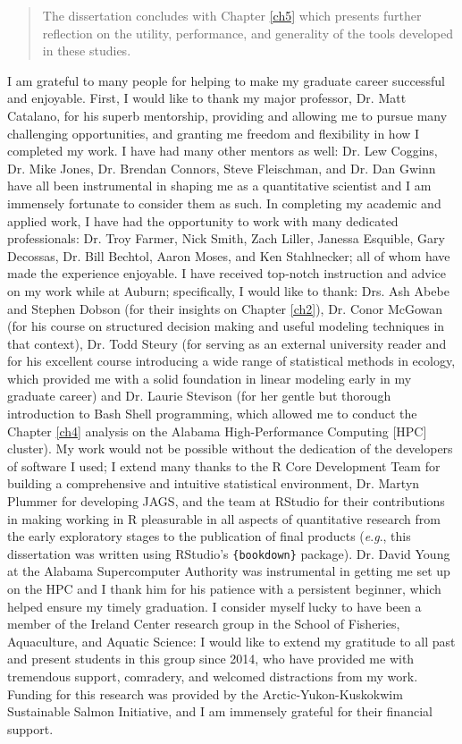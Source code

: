 \begin{romanpages}
\begin{abstract}
The dissertation concludes with Chapter \ref{ch5} which presents further reflection on the utility, performance, and generality of the tools developed in these studies.

\end{abstract}

\begin{acknowledgments}
\noindent
I am grateful to many people for helping to make my graduate career successful and enjoyable. First, I would like to thank my major professor, Dr. Matt Catalano, for his superb mentorship, providing and allowing me to pursue many challenging opportunities, and granting me freedom and flexibility in how I completed my work. I have had many other mentors as well: Dr. Lew Coggins, Dr. Mike Jones, Dr. Brendan Connors, Steve Fleischman, and Dr. Dan Gwinn have all been instrumental in shaping me as a quantitative scientist and I am immensely fortunate to consider them as such. In completing my academic and applied work, I have had the opportunity to work with many dedicated professionals: Dr. Troy Farmer, Nick Smith, Zach Liller, Janessa Esquible, Gary Decossas, Dr. Bill Bechtol, Aaron Moses, and Ken Stahlnecker; all of whom have made the experience enjoyable. I have received top-notch instruction and advice on my work while at Auburn; specifically, I would like to thank: Drs. Ash Abebe and Stephen Dobson (for their insights on Chapter \ref{ch2}), Dr. Conor McGowan (for his course on structured decision making and useful modeling techniques in that context), Dr. Todd Steury (for serving as an external university reader and for his excellent course introducing a wide range of statistical methods in ecology, which provided me with a solid foundation in linear modeling early in my graduate career) and Dr. Laurie Stevison (for her gentle but thorough introduction to Bash Shell programming, which allowed me to conduct the Chapter \ref{ch4} analysis on the Alabama High-Performance Computing [HPC] cluster). My work would not be possible without the dedication of the developers of software I used; I extend many thanks to the R Core Development Team for building a comprehensive and intuitive statistical environment, Dr. Martyn Plummer for developing JAGS, and the team at RStudio for their contributions in making working in R pleasurable in all aspects of quantitative research from the early exploratory stages to the publication of final products (\textit{e}.\textit{g}., this dissertation was written using RStudio's \texttt{\{bookdown\}} package). Dr. David Young at the Alabama Supercomputer Authority was instrumental in getting me set up on the HPC and I thank him for his patience with a persistent beginner, which helped ensure my timely graduation. I consider myself lucky to have been a member of the Ireland Center research group in the School of Fisheries, Aquaculture, and Aquatic Science: I would like to extend my gratitude to all past and present students in this group since 2014, who have provided me with tremendous support, comradery, and welcomed distractions from my work. Funding for this research was provided by the Arctic-Yukon-Kuskokwim Sustainable Salmon Initiative, and I am immensely grateful for their financial support. 
\end{acknowledgments}
\end{romanpages}

